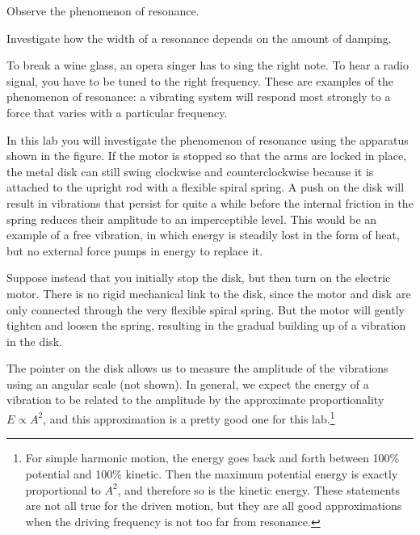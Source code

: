 \label{resonancelab}\label{lab:resonance}

\apparatus
{}

\begin{goals}

\item[] Observe the phenomenon of resonance.

\item[] Investigate how the width of a resonance depends on
the amount of damping.
\end{goals}

\introduction

To break a wine glass, an opera singer has to sing the right
note. To hear a radio signal, you have to be tuned to the
right frequency. These are examples of the phenomenon of
resonance: a vibrating system will respond most strongly to
a force that varies with a particular frequency.


\apparatus
In this lab you will investigate the phenomenon of resonance
using the apparatus shown in the figure. If the motor is
stopped so that the arms are locked in place, the metal disk
can still swing clockwise and counterclockwise because it is
attached to the upright rod with a flexible spiral spring. A
push on the disk will result in vibrations that persist for
quite a while before the internal friction in the spring
reduces their amplitude to an imperceptible level. This
would be an example of a free vibration, in which energy is
steadily lost in the form of heat, but no external force
pumps in energy to replace it.

Suppose instead that you initially stop the disk, but then
turn on the electric motor. There is no rigid mechanical
link to the disk, since the motor and disk are only
connected through the very flexible spiral spring. But the
motor will gently tighten and loosen the spring, resulting
in the gradual building up of a vibration in the disk.

The pointer on the disk allows us to measure the amplitude
of the vibrations using an angular scale (not shown). In general,
we expect the energy of a vibration to be related to the
amplitude by the approximate proportionality $E\propto A^2$,
and this approximation is a pretty good one for this lab.\footnote{For
simple harmonic motion, the energy goes back and forth between
100\% potential and 100\% kinetic. Then the maximum potential energy
is exactly proportional to $A^2$, and therefore so is the kinetic
energy. These statements are not all true for the driven motion,
but they are all good approximations when the driving frequency
is not too far from resonance.}

